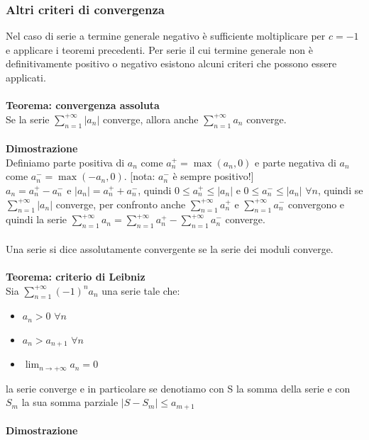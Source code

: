 \documentclass{article}
\begin{document}
\subsubsection{Altri criteri di convergenza}
Nel caso di serie a termine generale negativo è sufficiente moltiplicare per $c=-1$ e applicare i teoremi precedenti. Per serie il cui termine generale non è definitivamente positivo o negativo esistono alcuni criteri che possono essere applicati.\\\\
\textbf{Teorema: convergenza assoluta}\\
Se la serie $\sum_{n=1}^{+\infty}|a_n|$ converge, allora anche $\sum_{n=1}^{+\infty}a_n$ converge.\\\\
\textbf{Dimostrazione}\\
Definiamo parte positiva di $a_n$ come $a_n^+=\max(a_n,0)$ e parte negativa di $a_n$ come $a_n^-=\max(-a_n, 0)$. [nota: $a_n^-$ è sempre positivo!]\\
$a_n=a_n^+-a_n^-$ e $|a_n|=a_n^++a_n^-$, quindi $0\leq a_n^+\leq|a_n|$ e $0\leq a_n^-\leq|a_n|$ $\forall n$, quindi se $\sum_{n=1}^{+\infty}|a_n|$ converge, per confronto anche $\sum_{n=1}^{+\infty}a_n^+$ e $\sum_{n=1}^{+\infty}a_n^-$ convergono e quindi la serie $\sum_{n=1}^{+\infty}a_n=\sum_{n=1}^{+\infty}a_n^+-\sum_{n=1}^{+\infty}a_n^-$ converge.\\
\\
Una serie si dice assolutamente convergente se la serie dei moduli converge.\\\\
\textbf{Teorema: criterio di Leibniz}\\
Sia $\sum_{n=1}^{+\infty}(-1)^na_n$ una serie tale che:
\begin{itemize}
    \item $a_n>0$ $\forall n$
    \item $a_n>a_{n+1}$ $\forall n$
    \item $\lim_{n\rightarrow+\infty}a_n=0$
\end{itemize}
la serie converge e in particolare se denotiamo con S la somma della serie e con $S_m$ la sua somma parziale $|S-S_m|\leq a_{m+1}$\\\\
\textbf{Dimostrazione}\\
\end{document}
